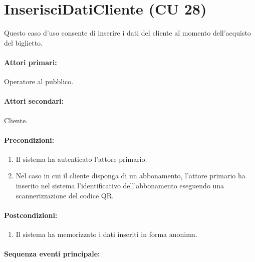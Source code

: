 \documentclass{article}
\begin{document}
\newpage

\section*{InserisciDatiCliente (CU 28)}
	
\indent\indent Questo caso d'uso consente di inserire i dati del cliente al momento dell'acquisto del biglietto.
	
	\paragraph{Attori primari:}Operatore al pubblico.
	
	\paragraph{Attori secondari:}Cliente.
	
	\paragraph{Precondizioni:}
	\begin{enumerate}[itemsep=8pt,parsep=0pt]
		\item Il sistema ha autenticato l'attore primario.
		\item Nel caso in cui il cliente disponga di un abbonamento, l'attore primario ha inserito nel sistema l'identificativo dell'abbonamento eseguendo una scannerizzazione del codice QR.
	\end{enumerate}

	\paragraph{Postcondizioni:}
	\begin{enumerate}[itemsep=8pt,parsep=0pt]
		\item Il sistema ha memorizzato i dati inseriti in forma anonima.
	\end{enumerate}
	
	\paragraph{Sequenza eventi principale:}
\end{document}
